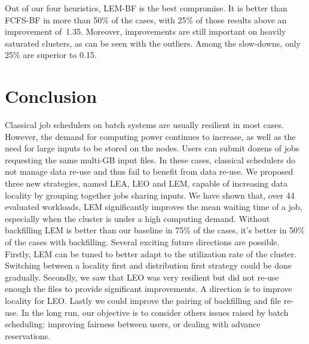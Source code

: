 \documentclass[conference,10pt]{IEEEtran}
\begin{document}
Out of our four heuristics, LEM-BF is the best compromise.
It is better than FCFS-BF in more than 50\% of the cases, 
with 25\% of those results above an improvement of~1.35.
Moreover, improvements are still important on heavily saturated clusters, as can be seen with the outliers.
Among the slow-downs, only 25\% are superior to 0.15.


\section{Conclusion}\label{sec.conclusion}


Classical job schedulers on batch systems are usually resilient
in most cases. 
However, the demand for computing power continues to increase,
as well as the need for large inputs to be stored on the nodes. 
Users can submit dozens of jobs requesting the same multi-GB input files.
In these cases, classical schedulers do not manage data re-use and 
thus fail to benefit from data re-use.
We proposed three new strategies, named LEA, LEO and LEM, 
capable of increasing data locality by grouping together 
jobs sharing inputs. We have shown that, over 44 evaluated workloads,
LEM significantly improves the mean waiting time of a job, especially 
when the cluster is under a high computing demand.
Without backfilling LEM is better than our baseline in 75\% of the cases, it's better 
in 50\% of the cases with backfilling. 
Several exciting future directions are possible.
Firstly, LEM can be tuned to better adapt to the utilization rate of the cluster.
Switching between a locality first and distribution first strategy could be done 
gradually.
Secondly, we saw that LEO was very resilient but did not re-use enough the files to
provide significant improvements. A direction is to 
improve locality for LEO.
Lastly we could improve the pairing of backfilling and file re-use.
In the long run, our objective is to consider others issues raised by batch scheduling:
improving fairness between users, or dealing with advance reservations.
 


\end{document}
